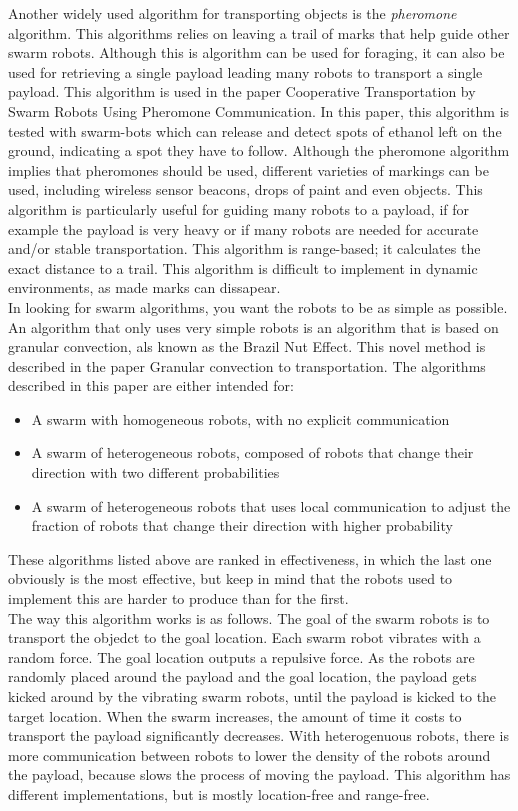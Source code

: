 Another widely used algorithm for transporting objects is the \emph{pheromone} algorithm. 
This algorithms relies on leaving a trail of marks that help guide other swarm robots. 
Although this is algorithm can be used for foraging, it can also be used for retrieving a single payload leading many robots to transport a single payload.
This algorithm is used in the paper Cooperative Transportation by Swarm Robots Using Pheromone Communication. \cite{fujisawa2013cooperative}
 In this paper, this algorithm is tested with swarm-bots which can release and detect spots of ethanol left on the ground, indicating a spot they have to follow. Although the pheromone algorithm implies that pheromones should be used, different varieties of markings can be used, including wireless sensor beacons, drops of paint and even objects. This algorithm is particularly useful for guiding many robots to a payload, if for example the payload is very heavy or if many robots are needed for accurate and/or stable transportation. This algorithm is range-based; it calculates the exact distance to a trail. This algorithm is difficult to implement in dynamic environments, as made marks can dissapear. \\

In looking for swarm algorithms, you want the robots to be as simple as possible. An algorithm that only uses very simple robots is an algorithm that is based on granular convection, als known as the Brazil Nut Effect. This novel method is described in the paper Granular convection to transportation.\cite{sugawara2012object} The algorithms described in this paper are either intended for:

\begin{itemize}
  \item A swarm with homogeneous robots, with no explicit communication
  \item A swarm of heterogeneous robots, composed of robots that change their direction with two different probabilities
  \item A swarm of heterogeneous robots that uses local communication to adjust the fraction of robots that change their direction with higher probability
\end{itemize}

These algorithms listed above are ranked in effectiveness, in which the last one obviously is the most effective, but keep in mind that the robots used to implement this are harder to produce than for the first. \\ The way this algorithm works is as follows. The goal of the swarm robots is to transport the objedct to the goal location. Each swarm robot vibrates with a random force. The goal location outputs a repulsive force. As the robots are randomly placed around the payload and the goal location, the payload gets kicked around by the vibrating swarm robots, until the payload is kicked to the target location. When the swarm increases, the amount of time it costs to transport the payload significantly decreases. With heterogenuous robots, there is more communication between robots to lower the density of the robots around the payload, because slows the process of moving the payload.  This algorithm has different implementations, but is mostly location-free and  range-free. 

